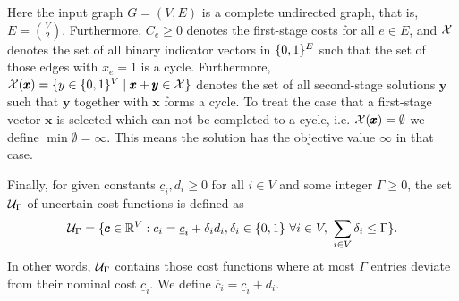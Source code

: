 Here the input graph $G = (V,E)$ is a complete undirected graph, that is, $E = {V \choose 2}$.
Furthermore, $C_e \geq 0$ denotes the first-stage costs for all $e \in E$, and $\mathcal{X}$ denotes the set of all binary indicator vectors in $\{ 0,1 \}^E$ such that the set of those edges with $x_e=1$ is a  cycle.
 Furthermore, $\mathcal{X}(\pmb x) = \{ y \in \{ 0,1 \}^V \mid \pmb x + \pmb y \in \mathcal{X} \}$ denotes the set of all second-stage solutions $\pmb y$ such that $\pmb y$ together with $\pmb x$ forms a  cycle.
 To treat the case that a first-stage vector $\pmb x$ is selected which can not be completed to a  cycle, i.e. $\mathcal{X}(\pmb x) = \emptyset$ we define $\min \emptyset = \infty$.
 This means the solution has the objective value $\infty$ in that case.

Finally, for given constants $\underline{c}_i, d_i \geq 0$ for all $i \in V$ and some integer $\Gamma \geq 0$, the set $\mathcal{U}_\Gamma$ of uncertain cost functions is defined as
\[
\mathcal{U}_\Gamma = \{  \pmb c \in \mathbb{R}^V : c_i = \underline{c}_i + \delta_id_i, \delta_i \in \{ 0,1 \}\ \forall i \in V,\ \sum_{i \in V}\delta_i \leq \Gamma  \}.
\]
In other words, $\mathcal{U}_\Gamma$ contains those cost functions where at most $\Gamma$ entries deviate from their nominal cost $\underline{c}_i$. We define $\overline{c}_i = \underline{c}_i + d_i$. 


